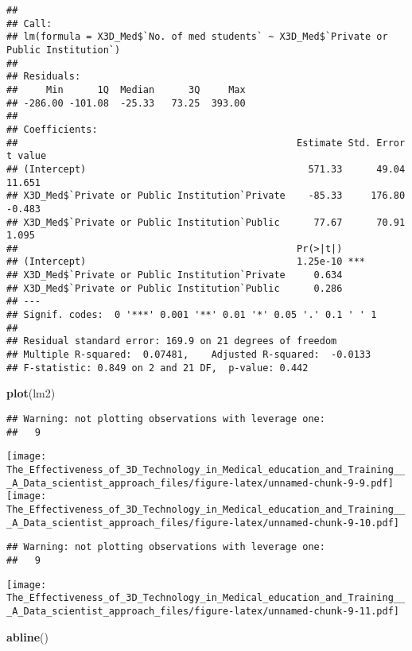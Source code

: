 \documentclass[]{article}
\newenvironment{Shaded}{\begin{snugshade}}{\end{snugshade}}
\newcommand{\KeywordTok}[1]{\textcolor[rgb]{0.13,0.29,0.53}{\textbf{#1}}}
\newcommand{\NormalTok}[1]{#1}
\begin{document}
\begin{verbatim}
## 
## Call:
## lm(formula = X3D_Med$`No. of med students` ~ X3D_Med$`Private or Public Institution`)
## 
## Residuals:
##     Min      1Q  Median      3Q     Max 
## -286.00 -101.08  -25.33   73.25  393.00 
## 
## Coefficients:
##                                                 Estimate Std. Error t value
## (Intercept)                                       571.33      49.04  11.651
## X3D_Med$`Private or Public Institution`Private    -85.33     176.80  -0.483
## X3D_Med$`Private or Public Institution`Public      77.67      70.91   1.095
##                                                 Pr(>|t|)    
## (Intercept)                                     1.25e-10 ***
## X3D_Med$`Private or Public Institution`Private     0.634    
## X3D_Med$`Private or Public Institution`Public      0.286    
## ---
## Signif. codes:  0 '***' 0.001 '**' 0.01 '*' 0.05 '.' 0.1 ' ' 1
## 
## Residual standard error: 169.9 on 21 degrees of freedom
## Multiple R-squared:  0.07481,    Adjusted R-squared:  -0.0133 
## F-statistic: 0.849 on 2 and 21 DF,  p-value: 0.442
\end{verbatim}

\begin{Shaded}
\begin{Highlighting}[]
\KeywordTok{plot}\NormalTok{(lm2)}
\end{Highlighting}
\end{Shaded}

\begin{verbatim}
## Warning: not plotting observations with leverage one:
##   9
\end{verbatim}

\texttt{[image: The\_Effectiveness\_of\_3D\_Technology\_in\_Medical\_education\_and\_Training\_\_\_A\_Data\_scientist\_approach\_files/figure-latex/unnamed-chunk-9-9.pdf]}
\texttt{[image: The\_Effectiveness\_of\_3D\_Technology\_in\_Medical\_education\_and\_Training\_\_\_A\_Data\_scientist\_approach\_files/figure-latex/unnamed-chunk-9-10.pdf]}

\begin{verbatim}
## Warning: not plotting observations with leverage one:
##   9
\end{verbatim}

\texttt{[image: The\_Effectiveness\_of\_3D\_Technology\_in\_Medical\_education\_and\_Training\_\_\_A\_Data\_scientist\_approach\_files/figure-latex/unnamed-chunk-9-11.pdf]}

\begin{Shaded}
\begin{Highlighting}[]
\KeywordTok{abline}\NormalTok{()}
\end{Highlighting}
\end{Shaded}
\end{document}

